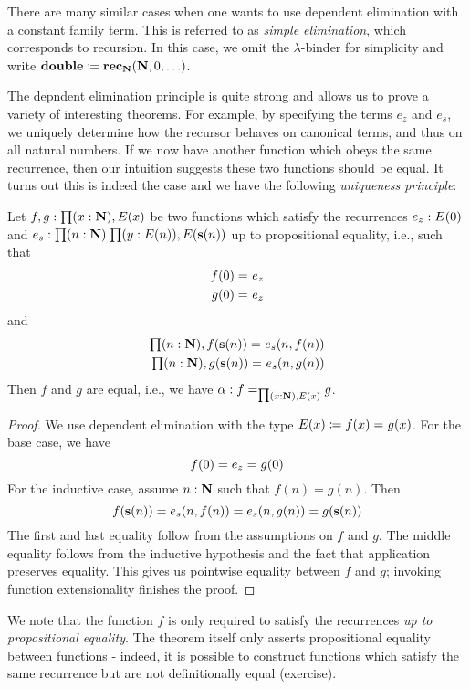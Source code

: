 There are many similar cases when one wants to use dependent elimination with a constant family term. This is referred to as \emph{simple elimination}, which corresponds to recursion. In this case, we omit the $\lambda$-binder for simplicity and write $\mathbf{double} \coloneqq \mathbf{rec}_\mathbf{N}(\mathbf{N}, 0, \ldots)$.

The depndent elimination principle is quite strong and allows us to prove a variety of interesting theorems. For example, by specifying the terms $e_z$ and $e_s$, we  uniquely determine how the recursor behaves on canonical terms, and thus on all natural numbers. If we now have another function which obeys the same recurrence, then our intuition suggests these two functions should be equal. It turns out this is indeed the case and we have the following \emph{uniqueness principle}:

\begin{thm}
Let $f,g : \prd{x:\nat} E(x)$ be two functions which satisfy the recurrences $e_z : E(0)$ and $e_s : \prd{n : \nat}{y : E(n)} E(\s(n))$ up to propositional equality, i.e., such that
\begin{align*}
f(0) =_{} e_z \\ 
g(0) =_{} e_z
\end{align*}
and 
\begin{align*}
\prd{n : \nat} \id{f(\s(n))}{e_s(n, f(n))} \\
\prd{n : \nat} \id{g(\s(n))}{e_s(n, g(n))}
\end{align*}
Then $f$ and $g$ are equal, i.e., we have $\alpha : \id[\prd{x :\nat} E(x)]{f}{g}$. 
\end{thm}

\begin{proof}
We use dependent elimination with the type $E(x) \coloneqq f(x) =_{} g(x)$. For the base case, we have \[f(0) = e_z = g(0)\]
For the inductive case, assume $n : \mathbf{N}$ such that $f(n) = g(n)$. Then
\[ f(\mathbf{s}(n)) = e_s(n, f(n)) = e_s(n, g(n)) = g(\mathbf{s}(n)) \]
The first and last equality follow from the assumptions on $f$ and $g$. The middle equality follows from the inductive hypothesis and the fact that application preserves equality. This gives us pointwise equality between $f$ and $g$; invoking function extensionality finishes the proof.
\end{proof}
We note that the function $f$ is only required to satisfy the recurrences \emph{up to propositional equality}. The theorem itself only asserts propositional equality between functions - indeed, it is possible to construct functions which satisfy the same recurrence but are not definitionally equal (exercise). 

